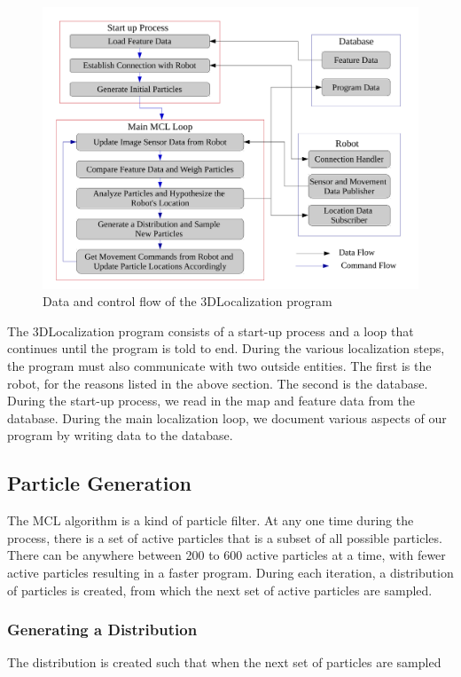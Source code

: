 \documentclass[a4paper,11pt]{article}
\begin{document}
  \begin{figure}[h!]
   \centering
     \includegraphics[width=\textwidth]{../Artifacts/FlowChart}
 \caption{Data and control flow of the 3DLocalization program}
 \label{fig:flowchart}
\end{figure}

The 3DLocalization program consists of a start-up process and a loop that continues until the program is told to end. During the various localization steps, the program must also communicate with two outside entities. The first is the robot, for the reasons listed in the above section. The second is the database. During the start-up process, we read in the map and feature data from the database. During the main localization loop, we document various aspects of our program by writing data to the database. 

\subsection{Particle Generation}
The MCL algorithm is a kind of particle filter. At any one time during the process, there is a set of active particles that is a subset of all possible particles. There can be anywhere between 200 to 600 active particles at a time, with fewer active particles resulting in a faster program. During each iteration, a distribution of particles is created, from which the next set of active particles are sampled.

\subsubsection{Generating a Distribution}
The distribution is created such that when the next set of particles are sampled
\end{document}
